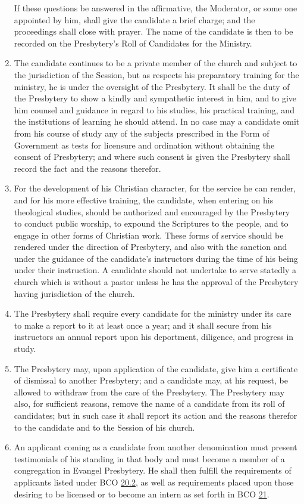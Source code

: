 \documentclass[
]{book}
\begin{document}
\begin{enumerate}
  If these questions be answered in the affirmative, the Moderator, or some one appointed by him, shall give the candidate a brief charge; and the proceedings shall close with prayer. The name of the candidate is then to be recorded on the Presbytery's Roll of Candidates for the Ministry.
\item
  The candidate continues to be a private member of the church and subject to the jurisdiction of the Session, but as respects his preparatory training for the ministry, he is under the oversight of the Presbytery. It shall be the duty of the Presbytery to show a kindly and sympathetic interest in him, and to give him counsel and guidance in regard to his studies, his practical training, and the institutions of learning he should attend. In no case may a candidate omit from his course of study any of the subjects prescribed in the Form of Government as tests for licensure and ordination without obtaining the consent of Presbytery; and where such consent is given the Presbytery shall record the fact and the reasons therefor.
\item
  For the development of his Christian character, for the service he can render, and for his more effective training, the candidate, when entering on his theological studies, should be authorized and encouraged by the Presbytery to conduct public worship, to expound the Scriptures to the people, and to engage in other forms of Christian work. These forms of service should be rendered under the direction of Presbytery, and also with the sanction and under the guidance of the candidate's instructors during the time of his being under their instruction. A candidate should not undertake to serve statedly a church which is without a pastor unless he has the approval of the Presbytery having jurisdiction of the church.
\item
  The Presbytery shall require every candidate for the ministry under its care to make a report to it at least once a year; and it shall secure from his instructors an annual report upon his deportment, diligence, and progress in study.
\item
  The Presbytery may, upon application of the candidate, give him a certificate of dismissal to another Presbytery; and a candidate may, at his request, be allowed to withdraw from the care of the Presbytery. The Presbytery may also, for sufficient reasons, remove the name of a candidate from its roll of candidates; but in such case it shall report its action and the reasons therefor to the candidate and to the Session of his church.
\item
  An applicant coming as a candidate from another denomination must present testimonials of his standing in that body and must become a member of a congregation in Evangel Presbytery. He shall then fulfill the requirements of applicants listed under BCO \protect\hyperlink{20.2}{20.2}, as well as requirements placed upon those desiring to be licensed or to become an intern as set forth in BCO \protect\hyperlink{21}{21}.
\end{enumerate}
\end{document}
